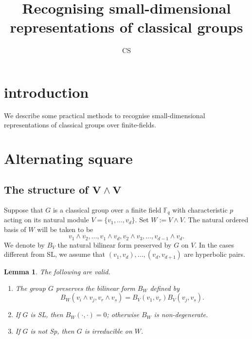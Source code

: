 \documentclass[12pt]{amsart}
\newtheorem{lemma}[theorem]{Lemma}
\theoremstyle{definition}
\newcommand{\F}{\mathbb F}
\begin{document}
\title{Recognising small-dimensional representations of classical groups}
\author{CS}
\address
{Departamento de Matem\'atica\\
Instituto de Ci\^encias Exatas\\
Universidade Federal de Minas Gerais
Belo Horizonte, MG, Brasil}


\maketitle

\begin{abstract}
\end{abstract}



\section{introduction}
We describe some practical methods to recognise
small-dimensional representations of classical groups over finite-fields.

\section{Alternating square}

\subsection{The structure of $\boldsymbol{V\wedge V}$}
Suppose that $G$ is a classical group over a finite field $\F_q$
with characteristic $p$ acting on its natural module
$V=\{v_1,\ldots,v_d\}$. Set
$W:=V\wedge V$. The natural ordered basis of $W$ will be taken to be
\[
v_1\wedge v_2,\ldots,v_1\wedge v_d,v_2\wedge v_3,\ldots,v_{d-1}\wedge v_d.
\]
We denote by $B_V$ the natural bilinear form preserved by $G$ on $V$.
In the cases different from SL, we assume that $(v_1,v_d),\ldots,(v_d,v_{d+1})$
are hyperbolic pairs.



\begin{lemma}\label{lem:str_notsp}
  The following are valid.
  \begin{enumerate}
  \item The group $G$ preserves the bilinear form $B_W$ defined by
    \[
    B_W(v_i\wedge v_j,v_r\wedge v_s)=B_V(v_1,v_r)B_V(v_j,v_s).
    \]
  \item If $G$ is SL, then $B_W(\cdot,\cdot)=0$; otherwise $B_W$ is non-degenerate.
  \item If $G$ is not Sp, then $G$ is irreducible on $W$.
  \end{enumerate}
\end{lemma}
\end{document}
